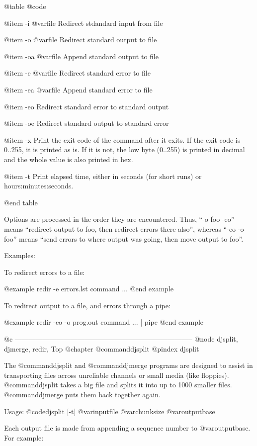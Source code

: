 @table @code

@item -i @var{file}
Redirect stdandard input from file

@item -o @var{file}
Redirect standard output to file

@item -oa @var{file}
Append standard output to file

@item -e @var{file}
Redirect standard error to file

@item -ea @var{file}
Append standard error to file

@item -eo
Redirect standard error to standard output

@item -oe
Redirect standard output to standard error

@item -x
Print the exit code of the command after it exits.  If the exit code is
0..255, it is printed as is.  If it is not, the low byte (0..255) is
printed in decimal and the whole value is also printed in hex.

@item -t
Print elapsed time, either in seconds (for short runs) or
hours:minutes:seconds.

@end table

Options are processed in the order they are encountered.  Thus, ``-o foo
-eo'' means ``redirect output to foo, then redirect errors there also'',
whereas ``-eo -o foo'' means ``send errors to where output was going, then
move output to foo''.


Examples:

To redirect errors to a file:

@example
redir -e errors.lst command ...
@end example

To redirect output to a file, and errors through a pipe:

@example
redir -eo -o prog.out command ... | pipe
@end example

@c -----------------------------------------------------------------------------
@node djsplit, djmerge, redir, Top
@chapter @command{djsplit}
@pindex djsplit

The @command{djsplit} and @command{djmerge} programs are designed to assist in
transporting files across unreliable channels or small media (like
floppies).  @command{djsplit} takes a big file and splits it into up to 1000
smaller files.  @command{djmerge} puts them back together again.

Usage: @code{djsplit [-t] @var{inputfile} @var{chunksize} @var{outputbase}}

Each output file is made from appending a sequence number to
@var{outputbase}.  For example:

